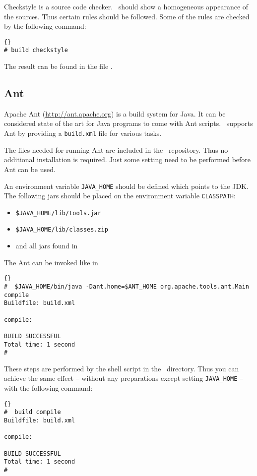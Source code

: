 Checkstyle is a source code checker.
\ExTeX\ should show a homogeneous appearance of the sources. Thus
certain rules should be followed. Some of the rules are checked by the
following command:

\begin{lstlisting}{}
# build checkstyle
\end{lstlisting}{}

The result can be found in the file .

\subsection{Ant}\label{sec:Ant}

Apache Ant (\url{http://ant.apache.org}) is a build system for Java.
It can be considered state of the art for Java programs to come with
Ant scripts. \ExTeX\ supports Ant by providing a \texttt{build.xml}
file for various tasks.

The files needed for running Ant are included in the \ExTeX\
repository. Thus no additional installation is required. Just some
setting need to be performed before Ant can be used.

An environment variable \verb|JAVA_HOME| should be defined which points
to the JDK. The following jars should be placed on the environment
variable \verb|CLASSPATH|:
\begin{itemize}
\item \verb|$JAVA_HOME/lib/tools.jar|
\item \verb|$JAVA_HOME/lib/classes.zip|
\item and all jars found in 
\end{itemize}

The Ant can be invoked like in

\begin{lstlisting}{}
#  $JAVA_HOME/bin/java -Dant.home=$ANT_HOME org.apache.tools.ant.Main compile
Buildfile: build.xml

compile:

BUILD SUCCESSFUL
Total time: 1 second
#
\end{lstlisting}

These steps are performed by the shell script  in the
\ExTeX\ directory. Thus you can achieve the same effect -- without any
preparations except setting \verb|JAVA_HOME| -- with the following command:

\begin{lstlisting}{}
#  build compile
Buildfile: build.xml

compile:

BUILD SUCCESSFUL
Total time: 1 second
#
\end{lstlisting}

